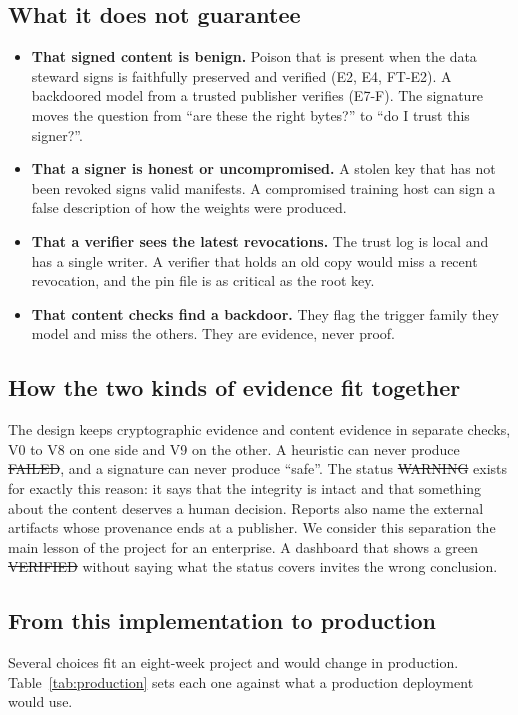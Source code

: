 \subsection{What it does not guarantee}
\begin{itemize}
\item \textbf{That signed content is benign.} Poison that is present when the data steward signs is
  faithfully preserved and verified (E2, E4, FT-E2). A backdoored model from a trusted publisher verifies
  (E7-F). The signature moves the question from ``are these the right bytes?'' to ``do I trust this signer?''.
\item \textbf{That a signer is honest or uncompromised.} A stolen key that has not been revoked signs valid
  manifests. A compromised training host can sign a false description of how the weights were produced.
\item \textbf{That a verifier sees the latest revocations.} The trust log is local and has a single writer. A
  verifier that holds an old copy would miss a recent revocation, and the pin file is as critical as the root
  key.
\item \textbf{That content checks find a backdoor.} They flag the trigger family they model and miss the
  others. They are evidence, never proof.
\end{itemize}

\subsection{How the two kinds of evidence fit together}
The design keeps cryptographic evidence and content evidence in separate checks, V0 to V8 on one side and V9 on
the other. A heuristic can never produce \st{FAILED}, and a signature can never produce ``safe''. The status
\st{WARNING} exists for exactly this reason: it says that the integrity is intact and that something about the
content deserves a human decision. Reports also name the external artifacts whose provenance ends at a
publisher. We consider this separation the main lesson of the project for an enterprise. A dashboard that shows
a green \st{VERIFIED} without saying what the status covers invites the wrong conclusion.

\subsection{From this implementation to production}
Several choices fit an eight-week project and would change in production. Table~\ref{tab:production} sets each
one against what a production deployment would use.

